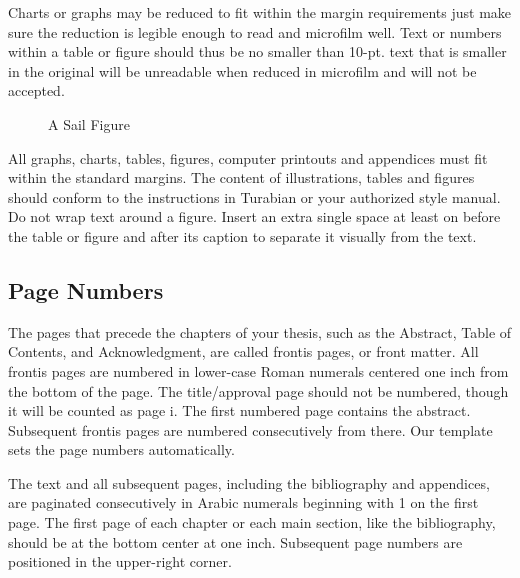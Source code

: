 Charts or graphs may be reduced to fit within the margin requirements just make sure the reduction
 is legible enough to read and microfilm well. Text or numbers within a table or figure should thus
 be no smaller than 10-pt. text that is smaller in the original will be unreadable when reduced in
 microfilm and will not be accepted. 

\begin{figure}[h]
\vspace{.1in}
\epsfxsize=2.0in
\centerline{}
\caption{A Sail Figure}
\label{fig-1}
\end{figure}

All graphs, charts, tables, figures, computer printouts and appendices must fit within the standard
 margins. The content of illustrations, tables and figures should conform to the instructions
 in Turabian or your authorized style manual.  
Do not wrap text around a figure. Insert an extra single space at least on before the table or
 figure and after its caption to separate it visually from the text.

\subsection{Page Numbers}
The pages that precede the chapters of your thesis, such as the Abstract, Table of Contents,
 and Acknowledgment, are called frontis pages, or front matter. All frontis pages are numbered
 in lower-case Roman numerals centered one inch from the bottom of the page. The title/approval
 page should not be numbered, though it will be counted as page i. The first numbered page contains
 the abstract. Subsequent frontis pages are numbered consecutively from there.
 Our template sets the page numbers automatically.

The text and all subsequent pages, including the bibliography and appendices, are paginated
 consecutively in Arabic numerals beginning with 1 on the first page. The first page of each
 chapter or each main section, like the bibliography, should be at the bottom center at one inch.
 Subsequent page numbers are positioned in the upper-right corner.  

